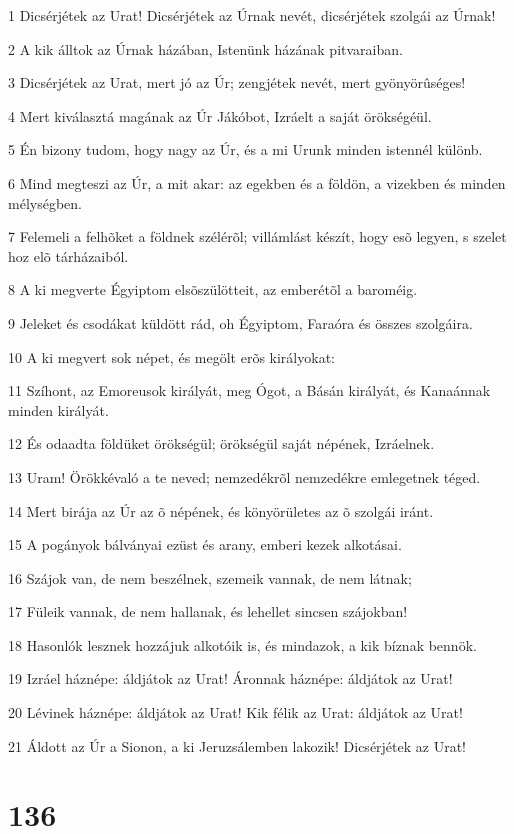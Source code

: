 \par 1 Dicsérjétek az Urat! Dicsérjétek az Úrnak nevét, dicsérjétek szolgái az Úrnak!
\par 2 A kik álltok az Úrnak házában, Istenünk házának pitvaraiban.
\par 3 Dicsérjétek az Urat, mert jó az Úr; zengjétek nevét, mert gyönyörûséges!
\par 4 Mert kiválasztá magának az Úr Jákóbot, Izráelt a saját örökségéül.
\par 5 Én bizony tudom, hogy nagy az Úr, és a mi Urunk minden istennél különb.
\par 6 Mind megteszi az Úr, a mit akar: az egekben és a földön, a vizekben és minden mélységben.
\par 7 Felemeli a felhõket a földnek szélérõl; villámlást készít, hogy esõ legyen, s szelet hoz elõ tárházaiból.
\par 8 A ki megverte Égyiptom elsõszülötteit, az emberétõl a baroméig.
\par 9 Jeleket és csodákat küldött rád, oh Égyiptom, Faraóra és összes szolgáira.
\par 10 A ki megvert sok népet, és megölt erõs királyokat:
\par 11 Szíhont, az Emoreusok királyát, meg Ógot, a Básán királyát, és Kanaánnak minden királyát.
\par 12 És odaadta földüket örökségül; örökségül saját népének, Izráelnek.
\par 13 Uram! Örökkévaló a te neved; nemzedékrõl nemzedékre emlegetnek téged.
\par 14 Mert birája az Úr az õ népének, és könyörületes az õ szolgái iránt.
\par 15 A pogányok bálványai ezüst és arany, emberi kezek alkotásai.
\par 16 Szájok van, de nem beszélnek, szemeik vannak, de nem látnak;
\par 17 Füleik vannak, de nem hallanak, és lehellet sincsen szájokban!
\par 18 Hasonlók lesznek hozzájuk alkotóik is, és mindazok, a kik bíznak bennök.
\par 19 Izráel háznépe: áldjátok az Urat! Áronnak háznépe: áldjátok az Urat!
\par 20 Lévinek háznépe: áldjátok az Urat! Kik félik az Urat: áldjátok az Urat!
\par 21 Áldott az Úr a Sionon, a ki Jeruzsálemben lakozik! Dicsérjétek az Urat!

\chapter{136}

